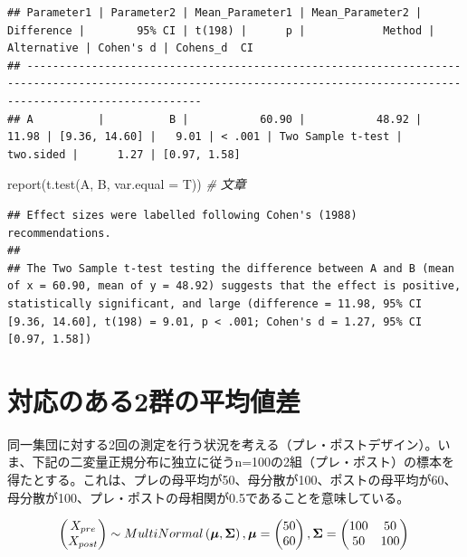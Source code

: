 \documentclass[
  ja=standard, xelatex, base=12pt]{bxjsreport}
\newenvironment{Shaded}{\begin{snugshade}}{\end{snugshade}}
\newcommand{\AttributeTok}[1]{\textcolor[rgb]{0.77,0.63,0.00}{#1}}
\newcommand{\CommentTok}[1]{\textcolor[rgb]{0.56,0.35,0.01}{\textit{#1}}}
\newcommand{\FunctionTok}[1]{\textcolor[rgb]{0.00,0.00,0.00}{#1}}
\newcommand{\NormalTok}[1]{#1}
\begin{document}
\begin{verbatim}
## Parameter1 | Parameter2 | Mean_Parameter1 | Mean_Parameter2 | Difference |        95% CI | t(198) |      p |            Method | Alternative | Cohen's d | Cohens_d  CI
## -----------------------------------------------------------------------------------------------------------------------------------------------------------------------
## A          |          B |           60.90 |           48.92 |      11.98 | [9.36, 14.60] |   9.01 | < .001 | Two Sample t-test |   two.sided |      1.27 | [0.97, 1.58]
\end{verbatim}

\begin{Shaded}
\begin{Highlighting}[]
\FunctionTok{report}\NormalTok{(}\FunctionTok{t.test}\NormalTok{(A, B, }\AttributeTok{var.equal =}\NormalTok{ T)) }\CommentTok{\# 文章}
\end{Highlighting}
\end{Shaded}

\begin{verbatim}
## Effect sizes were labelled following Cohen's (1988) recommendations.
## 
## The Two Sample t-test testing the difference between A and B (mean of x = 60.90, mean of y = 48.92) suggests that the effect is positive, statistically significant, and large (difference = 11.98, 95% CI [9.36, 14.60], t(198) = 9.01, p < .001; Cohen's d = 1.27, 95% CI [0.97, 1.58])
\end{verbatim}

\hypertarget{ux5bfeux5fdcux306eux3042ux308b2ux7fa4ux306eux5e73ux5747ux5024ux5dee}{%
\section{対応のある2群の平均値差}\label{ux5bfeux5fdcux306eux3042ux308b2ux7fa4ux306eux5e73ux5747ux5024ux5dee}}

同一集団に対する2回の測定を行う状況を考える（プレ・ポストデザイン）。いま、下記の二変量正規分布に独立に従うn=100の2組（プレ・ポスト）の標本を得たとする。これは、プレの母平均が50、母分散が100、ポストの母平均が60、母分散が100、プレ・ポストの母相関が0.5であることを意味している。

\[
\begin{pmatrix} X_{pre} \\ X_{post} \end{pmatrix} \sim MultiNormal \left( \boldsymbol{\mu}, \boldsymbol{\Sigma} \right),\\
\boldsymbol{\mu} = \begin{pmatrix} 50 \\ 60 \end{pmatrix}, 
\boldsymbol{\Sigma} = \begin{pmatrix} 100 & 50 \\ 
50 & 100 \end{pmatrix}\\
\]
\end{document}
